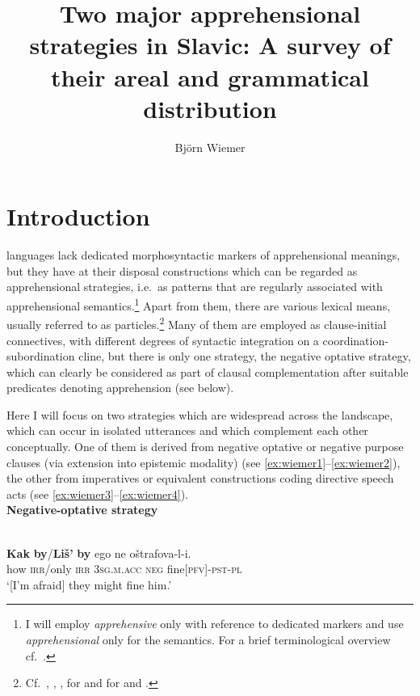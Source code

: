 \documentclass[output=paper,colorlinks,citecolor=brown]{langscibook}
\author{Björn Wiemer\affiliation{Johannes-Gutenberg-Universität Mainz}}
\title[Two major apprehensional strategies in Slavic]      {Two major apprehensional strategies in Slavic: A survey of their areal and grammatical distribution}
\begin{document}
\maketitle 


\section{Introduction}
\label{sec:intro}

 languages lack dedicated morphosyntactic markers of apprehensional meanings, but they have at their disposal constructions which can be regarded as apprehensional strategies, i.e.\ as patterns that are regularly associated with apprehensional semantics.\footnote{I will employ \textit{apprehensive} only with reference to dedicated markers and use \textit{apprehensional} only for the semantics. For a brief terminological overview cf.\ \citet[59]{MitkovskaEtAl2017}.} Apart from them, there are various lexical means, usually referred to as particles.\footnote{Cf.\ \citet[46--47]{Dobrushina2006wiemer}, \citet{Arkadiev2007}, \citet[448]{Plungian2011}, \citet{Mikaelian2021} for  and \citet{Ivanova2014} for  and .} Many of them are employed as clause-initial connectives, with different degrees of syntactic integration on a coordination-subordination cline, but there is only one strategy, the negative optative strategy, which can clearly be considered as part of clausal complementation after suitable predicates denoting apprehension (see  below).

Here I will focus on two strategies which are widespread across the  landscape, which can occur in isolated utterances and which complement each other conceptually. One of them is derived from negative optative or negative purpose clauses (via extension into epistemic modality) (see \ref{ex:wiemer1}--\ref{ex:wiemer2}), the other from imperatives or equivalent constructions coding directive speech acts (see \ref{ex:wiemer3}--\ref{ex:wiemer4}). \\

\noindent \textbf{Negative-optative strategy}

\ea\label{ex:wiemer1} \textnormal{} \\
\gll \textbf{Kak} \textbf{by}\textnormal{/}\textbf{Liš'} \textbf{by} ego ne oštrafova-l-i. \\
how \textsc{irr}/only \textsc{irr} \textsc{3sg.m.acc} \textsc{neg} fine\textsc{[pfv]-pst-pl} \\
\glt `[I'm afraid] they might fine him.'
\z 
\end{document}
